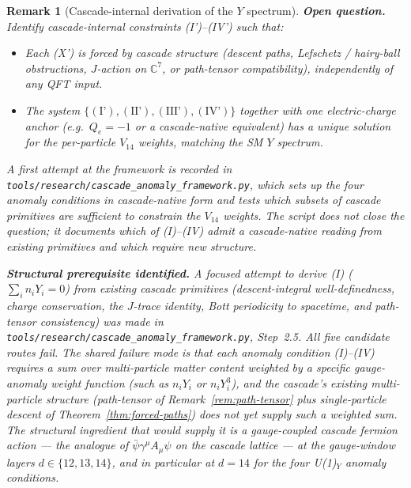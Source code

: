 \documentclass[12pt,a4paper]{article}
\newtheorem{remark}[theorem]{Remark}
\begin{document}
\begin{remark}[Cascade-internal derivation of the $Y$ spectrum]
\medskip\noindent\textbf{Open question.} Identify cascade-internal
constraints (I')--(IV') such that:
\begin{itemize}
\item Each (X') is forced by cascade structure (descent paths,
  Lefschetz / hairy-ball obstructions, $J$-action on $\mathbb{C}^7$,
  or path-tensor compatibility), independently of any QFT input.
\item The system $\{(\text{I'}),(\text{II'}),(\text{III'}),
  (\text{IV'})\}$ together with one electric-charge anchor (e.g.\
  $Q_e=-1$ or a cascade-native equivalent) has a unique solution
  for the per-particle $V_{14}$ weights, matching the SM $Y$
  spectrum.
\end{itemize}
A first attempt at the framework is recorded in
\texttt{tools/research/cascade\_anomaly\_framework.py}, which sets
up the four anomaly conditions in cascade-native form and tests
which subsets of cascade primitives are sufficient to constrain
the $V_{14}$ weights. The script does not close the question; it
documents which of (I)--(IV) admit a cascade-native reading from
existing primitives and which require new structure.

\medskip\noindent\textbf{Structural prerequisite identified.}
A focused attempt to derive (I) ($\sum_i n_i Y_i = 0$) from existing
cascade primitives (descent-integral well-definedness, charge
conservation, the $J$-trace identity, Bott periodicity to spacetime,
and path-tensor consistency) was made in
\texttt{tools/research/cascade\_anomaly\_framework.py}, Step~2.5.
All five candidate routes fail. The shared failure mode is that
each anomaly condition (I)--(IV) requires a sum over multi-particle
matter content weighted by a specific gauge-anomaly weight function
(such as $n_i Y_i$ or $n_i Y_i^3$), and the cascade's existing
multi-particle structure (path-tensor of
Remark~\ref{rem:path-tensor} plus single-particle descent of
Theorem~\ref{thm:forced-paths}) does not yet supply such a weighted
sum. The structural ingredient that would supply it is a
gauge-coupled cascade fermion action --- the analogue of
$\bar\psi\gamma^\mu A_\mu\psi$ on the cascade lattice --- at the
gauge-window layers $d\in\{12,13,14\}$, and in particular at
$d=14$ for the four U(1)$_Y$ anomaly conditions.


\end{remark}
\end{document}
